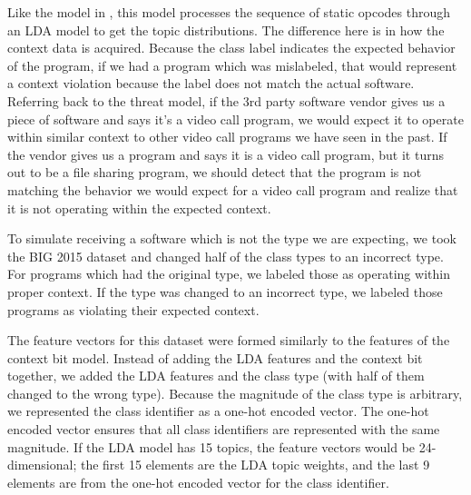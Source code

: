 \documentclass[../stegner_thesis.tex]{subfiles}
\begin{document}
\par Like the model in , this model processes the
sequence of static opcodes through an LDA model to get the topic distributions.
The difference here is in how the context data is acquired.
Because the class label indicates the expected behavior of the program, if we
had a program which was mislabeled, that would represent a context violation
because the label does not match the actual software.
Referring back to the threat model, if the 3rd party software vendor gives us
a piece of software and says it's a video call program, we would expect it to
operate within similar context to other video call programs we have seen in the
past.
If the vendor gives us a program and says it is a video call program, but it
turns out to be a file sharing program, we should detect that the program is
not matching the behavior we would expect for a video call program and realize
that it is not operating within the expected context.

\par To simulate receiving a software which is not the type we are expecting,
we took the BIG 2015 dataset and changed half of the class types to an
incorrect type.
For programs which had the original type, we labeled those as operating within
proper context.
If the type was changed to an incorrect type, we labeled those programs as
violating their expected context.

\par The feature vectors for this dataset were formed similarly to the features
of the context bit model.
Instead of adding the LDA features and the context bit together, we added the
LDA features and the class type (with half of them changed to the wrong type).
Because the magnitude of the class type is arbitrary, we represented the class
identifier as a one-hot encoded vector.
The one-hot encoded vector ensures that all class identifiers are represented
with the same magnitude.
If the LDA model has 15 topics, the feature vectors would be 24-dimensional;
the first 15 elements are the LDA topic weights, and the last 9 elements are
from the one-hot encoded vector for the class identifier.

\newpage
\end{document}
